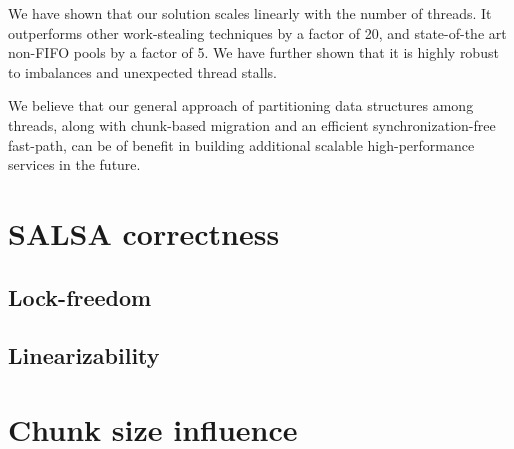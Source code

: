 \documentclass[11pt]{article}
\theoremstyle{plain}
\begin{document}
We have shown that our solution scales linearly with the number
of threads. It outperforms other work-stealing techniques by a
factor of 20, and state-of-the art non-FIFO pools by a factor of 5.
We have further shown that it is highly robust to imbalances and
unexpected thread stalls.

We believe that our general approach of partitioning data structures
among threads, along with chunk-based migration and an efficient
synchronization-free fast-path, can be of benefit in building
additional scalable high-performance services in the future.



\pagebreak \small

\begin{appendix}

\section{SALSA correctness}
\subsection{Lock-freedom}
\label{appendix:lock-freedom}

\subsection{Linearizability}
\label{appendix:salsa-correctness}

\clearpage
\section{Chunk size influence}
\label{appendix:chunk-size}


\end{appendix}
\end{document}

